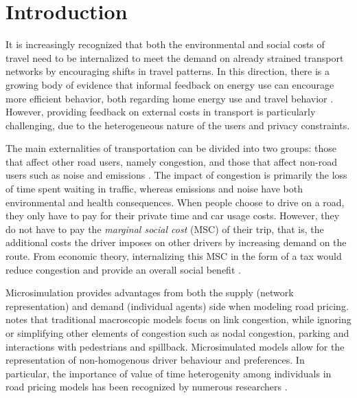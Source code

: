 \section{Introduction}

It is increasingly recognized that both the environmental and social costs of travel need to be internalized to meet the demand on already strained transport networks by encouraging shifts in travel patterns.
In this direction, there is a growing body of evidence that informal feedback on energy use can encourage more efficient behavior, both regarding home energy use \citep{faruqui2010impact} and travel behavior \citep{taniguchi2003psychological, fujii2006determinants}.
However, providing feedback on external costs in transport is particularly challenging, due to the heterogeneous nature of the users and privacy constraints.

The main externalities of transportation can be divided into two groups: those that affect other road users, namely congestion, and those that affect non-road users such as noise and emissions \citep{button2004rationale}.
The impact of congestion is primarily the loss of time spent waiting in traffic, whereas emissions and noise have both environmental and health consequences.
When people choose to drive on a road, they only have to pay for their private time and car usage costs.
However, they do not have to pay the \textit{marginal social cost} (MSC) of their trip, that is, the additional costs the driver imposes on other drivers by increasing demand on the route.
From economic theory, internalizing this MSC in the form of a tax would reduce congestion and provide an overall social benefit \citep{arnott1994economics, pigou2013economics}.

Microsimulation provides advantages from both the supply (network representation) and demand (individual agents) side when modeling road pricing.
\citet{arnott2001economic} notes that traditional macroscopic models focus on link congestion, while ignoring or simplifying other elements of congestion such as nodal congestion, parking and interactions with pedestrians and spillback.
Microsimulated models allow for the representation of non-homogenous driver behaviour and preferences.
In particular, the importance of value of time heterogenity among individuals in road pricing models has been recognized by numerous researchers \citep{small2001value, verhoef2004product}.

